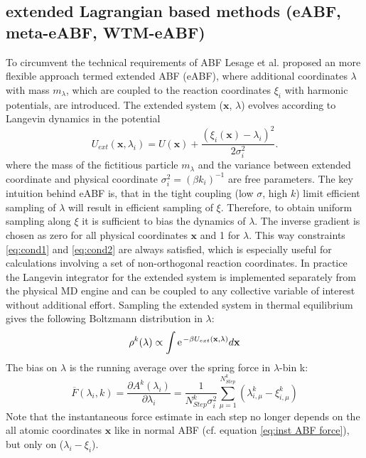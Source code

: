 \subsection{extended Lagrangian based methods (eABF, meta-eABF, WTM-eABF)}
\label{sec:eABF}
To circumvent the technical requirements of ABF Lesage et al.\autocite{lesage2017smoothed} proposed an more flexible approach termed extended ABF (eABF), where additional coordinates $\lambda$ with mass $m_{\lambda}$, which are coupled to the reaction coordinates $\xi_i$ with harmonic potentials, are introduced. The extended system ($\textbf{x}$, $\lambda$) evolves according to Langevin dynamics in the potential
\begin{equation}
  U_{ext}(\textbf{x},\lambda_i) = U(\textbf{x}) + \frac{(\xi_{i}(\textbf{x})-\lambda_i)^2}{2\sigma_i^2}.
\end{equation}
where the mass of the fictitious particle $m_\lambda$ and the variance between extended coordinate and physical coordinate $\sigma_i^2=(\beta k_i)^{-1}$ are free parameters.
The key intuition behind eABF is, that in the tight coupling (low $\sigma$, high $k$) limit efficient sampling of $\lambda$ will result in efficient sampling of $\xi$.
Therefore, to obtain uniform sampling along $\xi$ it is sufficient to bias the dynamics of $\lambda$. The inverse gradient is chosen as zero for all physical coordinates $\textbf{x}$ and 1 for $\lambda$.
This way constraints \ref{eq:cond1} and \ref{eq:cond2} are always satisfied, which is especially useful for calculations involving a set of non-orthogonal reaction coordinates.
In practice the Langevin integrator for the extended system is implemented separately from the physical MD engine and can be coupled to any collective variable of interest without additional effort.
Sampling the extended system in thermal equilibrium gives the following Boltzmann distribution in $\lambda$:
\begin{equation}
  \rho^k(\lambda) \propto \int \e^{-\beta U_{ext}(\textbf{x},\lambda)} d\textbf{x} \\
\end{equation}
The bias on $\lambda$ is the running average over the spring force in $\lambda$-bin k:
\begin{equation}
  \overline{F}(\lambda_{i}, k) = \frac{\partial A^{k}(\lambda_{i})}{\partial \lambda_i} = \frac{1}{N_{Step}^{k}\sigma_i^2} \sum_{\mu=1}^{N_{Step}^{k}} (\lambda_{i,\mu}^{k}-\xi_{i,\mu}^{k})
\end{equation}
Note that the instantaneous force estimate in each step no longer depends on the all atomic coordinates $\textbf{x}$ like in normal ABF (cf. equation \ref{eq:inst ABF force}), but only on ($\lambda_i - \xi_i$).
